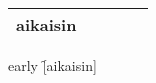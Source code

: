 \begin{center}
  \begin{tabular}{|c c c c c|}
    \hline
    aikaisin &&&&\\
    \hline
  \end{tabular}
\end{center}

\begin{questions}
  \begin{multicols}{3}
    \raggedcolumns
    \question early \f[aikaisin]
  \end{multicols}
\end{questions}
